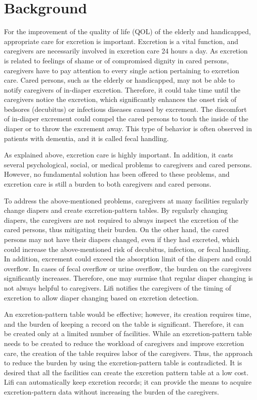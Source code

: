 \documentclass[publish,JRM,paper]{jaciiiarticle}
\begin{document}
\section{Background}
For the improvement of the quality of life (QOL) of the elderly and handicapped, appropriate care for excretion is important. Excretion is a vital function, and caregivers are necessarily involved in excretion care 24 hours a day. As excretion is related to feelings of shame or of compromised dignity in cared persons, caregivers have to pay attention to every single action pertaining to excretion care. Cared persons, such as the elderly or handicapped, may not be able to notify caregivers of in-diaper excretion. Therefore, it could take time until the caregivers notice the excretion, which significantly enhances the onset risk of bedsores (decubitus) or infectious diseases caused by excrement. The discomfort of in-diaper excrement could compel the cared persons to touch the inside of the diaper or to throw the excrement away. This type of behavior is often observed in patients with dementia, and it is called fecal handling.

As explained above, excretion care is highly important. In addition, it casts several psychological, social, or medical problems to caregivers and cared persons. However, no fundamental solution has been offered to these problems, and excretion care is still a burden to both caregivers and cared persons.

To address the above-mentioned problems, caregivers at many facilities regularly change diapers and create excretion-pattern tables. By regularly changing diapers, the caregivers are not required to always inspect the excretion of the cared persons, thus mitigating their burden. On the other hand, the cared persons may not have their diapers changed, even if they had excreted, which could increase the above-mentioned risk of decubitus, infection, or fecal handling. In addition, excrement could exceed the absorption limit of the diapers and could overflow. In cases of fecal overflow or urine overflow, the burden on the caregivers significantly increases. Therefore, one may surmise that regular diaper changing is not always helpful to caregivers. Lifi notifies the caregivers of the timing of excretion to allow diaper changing based on excretion detection.

An excretion-pattern table would be effective; however, its creation requires time, and the burden of keeping a record on the table is significant. Therefore, it can be created only at a limited number of facilities. While an excretion-pattern table needs to be created to reduce the workload of caregivers and improve excretion care, the creation of the table requires labor of the caregivers. Thus, the approach to reduce the burden by using the excretion-pattern table is contradicted. It is desired that all the facilities can create the excretion pattern table at a low cost. Lifi can automatically keep excretion records; it can provide the means to acquire excretion-pattern data without increasing the burden of the caregivers.
\end{document}
